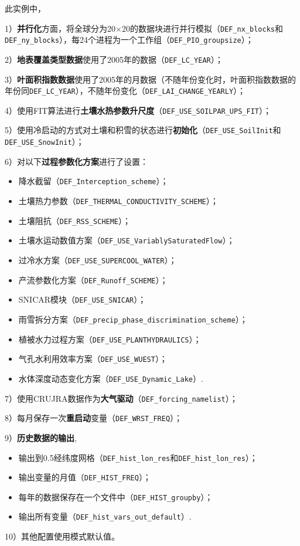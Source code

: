 此实例中，\par
1）\textbf{并行化}方面，将全球分为20\textdegree$\times$20\textdegree 的数据块进行并行模拟（\texttt{DEF\_nx\_blocks}和\texttt{DEF\_ny\_blocks}），每24个进程为一个工作组（\texttt{DEF\_PIO\_groupsize}）；\par
2）\textbf{地表覆盖类型数据}使用了2005年的数据（\texttt{DEF\_LC\_YEAR}）；\par
3）\textbf{叶面积指数数据}使用了2005年的月数据（不随年份变化时，叶面积指数数据的年份同\texttt{DEF\_LC\_YEAR}），不随年份变化（\texttt{DEF\_LAI\_CHANGE\_YEARLY}）；\par
4）使用FIT算法进行\textbf{土壤水热参数升尺度}（\texttt{DEF\_USE\_SOILPAR\_UPS\_FIT}）；\par
5）使用冷启动的方式对土壤和积雪的状态进行\textbf{初始化}（\texttt{DEF\_USE\_SoilInit}和\texttt{\allowbreak DEF\_\allowbreak USE\_SnowInit}）；\par
6）对以下\textbf{过程参数化方案}进行了设置：
\begin{itemize}[nosep,leftmargin=4em]
    \item 降水截留（\texttt{DEF\_Interception\_scheme}）；
    \item 土壤热力参数（\texttt{DEF\_THERMAL\_CONDUCTIVITY\_SCHEME}）；
    \item 土壤阻抗（\texttt{DEF\_RSS\_SCHEME}）；
    \item 土壤水运动数值方案（\texttt{DEF\_USE\_VariablySaturatedFlow}）；
    \item 过冷水方案（\texttt{DEF\_USE\_SUPERCOOL\_WATER}）；
    \item 产流参数化方案（\texttt{DEF\_Runoff\_SCHEME}）；
    \item SNICAR模块（\texttt{DEF\_USE\_SNICAR}）；
    \item 雨雪拆分方案（\texttt{DEF\_precip\_phase\_discrimination\_scheme}）；
    \item 植被水力过程方案（\texttt{DEF\_USE\_PLANTHYDRAULICS}）；
    \item 气孔水利用效率方案（\texttt{DEF\_USE\_WUEST}）；
    \item 水体深度动态变化方案（\texttt{DEF\_USE\_Dynamic\_Lake}）.
\end{itemize}
\par
7）使用CRUJRA数据作为\textbf{大气驱动}（\texttt{DEF\_forcing\_namelist}）；\par
8）每月保存一次\textbf{重启动}变量（\texttt{DEF\_WRST\_FREQ}）；\par
9）\textbf{历史数据的输出},
\begin{itemize}[nosep,leftmargin=4em]
    \item 输出到0.5\textdegree 经纬度网格（\texttt{DEF\_hist\_lon\_res}和\texttt{DEF\_hist\_lon\_res}）；
    \item 输出变量的月值（\texttt{DEF\_HIST\_FREQ}）；
    \item 每年的数据保存在一个文件中（\texttt{DEF\_HIST\_groupby}）；
    \item 输出所有变量（\texttt{DEF\_hist\_vars\_out\_default}）.
\end{itemize}\par
10）其他配置使用模式默认值。

